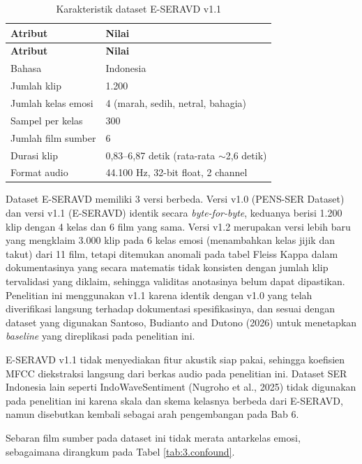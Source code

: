 {\renewcommand{\arraystretch}{1.3}\setlength{\tabcolsep}{10pt}
\begin{longtable}{|p{}|p{}|}
  \caption{Karakteristik dataset E-SERAVD v1.1}
  \label{tab:3.dataset} \\
  \hline
  \textbf{Atribut} & \textbf{Nilai} \\
  \hline
  \endfirsthead
  \hline
  \textbf{Atribut} & \textbf{Nilai} \\
  \hline
  \endhead
  \hline
  \endfoot
  \hline
  \endlastfoot
  Bahasa                & Indonesia \\ \hline
  Jumlah klip           & 1.200 \\ \hline
  Jumlah kelas emosi    & 4 (marah, sedih, netral, bahagia) \\ \hline
  Sampel per kelas      & 300 \\ \hline
  Jumlah film sumber    & 6 \\ \hline
  Durasi klip           & 0,83--6,87 detik (rata-rata $\sim$2,6 detik) \\ \hline
  Format audio          & 44.100 Hz, 32-bit float, 2 channel \\
\end{longtable}
}

\noindent
Dataset E-SERAVD memiliki 3 versi berbeda. Versi v1.0 (PENS-SER Dataset)
dan versi v1.1 (E-SERAVD) identik secara \emph{byte-for-byte}, keduanya
berisi 1.200 klip dengan 4 kelas dan 6 film yang sama. Versi v1.2
merupakan versi lebih baru yang mengklaim 3.000 klip pada 6 kelas emosi
(menambahkan kelas jijik dan takut) dari 11 film, tetapi ditemukan
anomali pada tabel Fleiss Kappa dalam dokumentasinya yang secara
matematis tidak konsisten dengan jumlah klip tervalidasi yang diklaim,
sehingga validitas anotasinya belum dapat dipastikan. Penelitian ini
menggunakan v1.1 karena identik dengan v1.0 yang telah diverifikasi
langsung terhadap dokumentasi spesifikasinya, dan sesuai dengan dataset
yang digunakan Santoso, Budianto and Dutono (2026) untuk menetapkan
\emph{baseline} yang direplikasi pada penelitian ini.

E-SERAVD v1.1 tidak menyediakan fitur akustik siap pakai, sehingga
koefisien MFCC diekstraksi langsung dari berkas audio pada penelitian
ini. Dataset SER Indonesia lain seperti IndoWaveSentiment (Nugroho et
al., 2025) tidak digunakan pada penelitian ini karena skala dan skema
kelasnya berbeda dari E-SERAVD, namun disebutkan kembali sebagai arah
pengembangan pada Bab 6.

Sebaran film sumber pada dataset ini tidak merata antarkelas emosi,
sebagaimana dirangkum pada Tabel \ref{tab:3.confound}.

